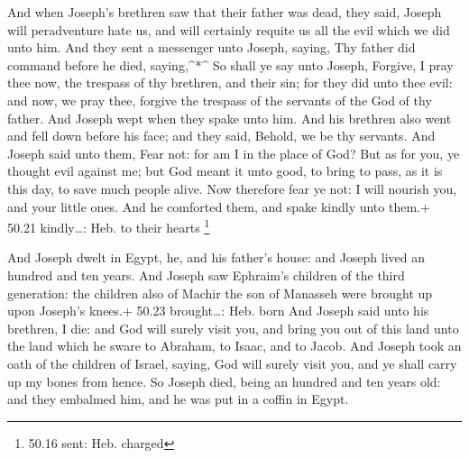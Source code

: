  And when Joseph's brethren saw that their father was dead,
they said, Joseph will peradventure hate us, and will certainly requite
us all the evil which we did unto him.  And they sent a
messenger unto Joseph, saying, Thy father did command before he died,
saying,\^{}*\^{}  So shall ye say unto Joseph, Forgive, I
pray thee now, the trespass of thy brethren, and their sin; for they did
unto thee evil: and now, we pray thee, forgive the trespass of the
servants of the God of thy father. And Joseph wept when they spake unto
him.  And his brethren also went and fell down before his
face; and they said, Behold, we be thy servants.  And
Joseph said unto them, Fear not: for am I in the place of God?
 But as for you, ye thought evil against me; but God meant
it unto good, to bring to pass, as it is this day, to save much people
alive.  Now therefore fear ye not: I will nourish you, and
your little ones. And he comforted them, and spake kindly unto them.+
50.21 kindly\ldots: Heb. to their hearts \footnote{50.16 sent: Heb.
  charged}

 And Joseph dwelt in Egypt, he, and his father's house: and
Joseph lived an hundred and ten years.  And Joseph saw
Ephraim's children of the third generation: the children also of Machir
the son of Manasseh were brought up upon Joseph's knees.+ 50.23
brought\ldots: Heb. born  And Joseph said unto his
brethren, I die: and God will surely visit you, and bring you out of
this land unto the land which he sware to Abraham, to Isaac, and to
Jacob.  And Joseph took an oath of the children of Israel,
saying, God will surely visit you, and ye shall carry up my bones from
hence.  So Joseph died, being an hundred and ten years old:
and they embalmed him, and he was put in a coffin in Egypt.
